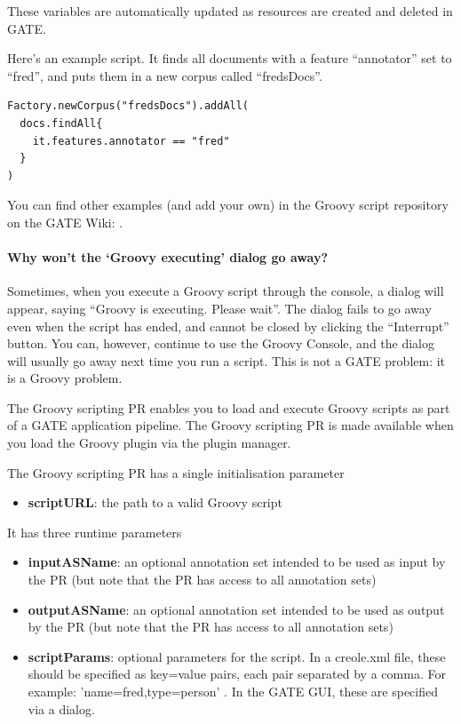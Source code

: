 These variables are automatically updated as resources are created and deleted
in GATE.

Here's an example script. It finds all documents with a feature ``annotator''
set to ``fred'', and puts them in a new corpus called ``fredsDocs''.

\begin{lstlisting}
Factory.newCorpus("fredsDocs").addAll(
  docs.findAll{
    it.features.annotator == "fred"
  }
)
\end{lstlisting}

You can find other examples (and add your own) in the Groovy script repository
on the GATE Wiki: .

\paragraph{Why won't the `Groovy executing' dialog go away?}

Sometimes, when you execute a Groovy script through the console, a dialog will
appear, saying ``Groovy is executing. Please wait''. The dialog fails to go
away even when the script has ended, and cannot be closed by clicking the
``Interrupt'' button. You can, however, continue to use the Groovy Console,
and the dialog will usually go away next time you run a script. This is not a
GATE problem: it is a Groovy problem.


The Groovy scripting PR enables you to load and execute Groovy scripts as part
of a GATE application pipeline. The Groovy scripting PR is made available when
you load the Groovy plugin via the plugin manager.


The Groovy scripting PR has a single initialisation parameter

\begin{itemize}
\item \textbf{scriptURL}: the path to a valid Groovy script
\end{itemize}

It has three runtime parameters

\begin{itemize}
\item \textbf{inputASName}: an optional annotation set intended to be used as input by
  the PR (but note that the PR has access to all annotation sets)
\item \textbf{outputASName}: an optional annotation set intended to be used as output by
  the PR (but note that the PR has access to all annotation sets)
\item \textbf{scriptParams}: optional parameters for the script. In a
  creole.xml file, these should be specified as key=value pairs,
  each pair separated by a comma. For example: 'name=fred,type=person' . In
  the GATE GUI, these are specified via a dialog.
\end{itemize}

